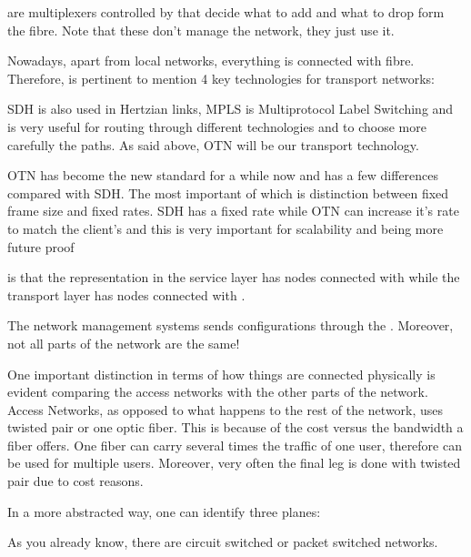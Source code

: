 

 are multiplexers controlled by  that decide what to add and what to drop form the fibre. Note that these don't manage the network, they just use it.

Nowadays, apart from local networks, everything is connected with fibre. Therefore, is pertinent to mention 4 key technologies for transport networks:


SDH is also used in Hertzian links, MPLS is Multiprotocol Label Switching and is very useful for routing through different technologies and to choose more carefully the paths. As said above, OTN will be our transport technology.

OTN has become the new standard for a while now and has a few differences compared with SDH. The most important of which is distinction between fixed frame size and fixed rates. SDH has a fixed rate while OTN can increase it's rate to match the client's and this is very important for scalability and being more future proof

 is that the representation in the service layer has nodes connected with  while the transport layer has nodes connected with .


The network management systems sends configurations through the . Moreover, not all parts of the network are the same!



One important distinction in terms of how things are connected physically is evident comparing the access networks with the other parts of the network. Access Networks, as opposed to what happens to the rest of the network, uses twisted pair or one optic fiber. This is because of the cost versus the bandwidth a fiber offers. One fiber can carry several times the traffic of one user, therefore can be used for multiple users. Moreover, very often the final leg is done with twisted pair due to cost reasons.

In a more abstracted way, one can identify three planes:


As you already know, there are circuit switched or packet switched networks.

